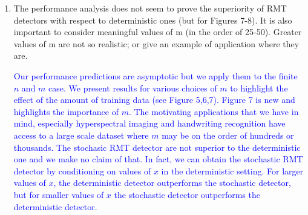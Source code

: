 \documentclass[11pt]{article}
\begin{document}
\begin{enumerate}
\item The performance analysis does  not seem to prove the superiority of RMT detectors with respect to deterministic ones (but for Figures 7-8). It is also important to consider meaningful values of m (in the order of 25-50). Greater values of m
are not so realistic; or give an example of application where they are.

\textcolor{blue}{Our performance predictions are asymptotic but we apply them to the finite $n$ and $m$ case. We present results for various choices of $m$ to highlight the effect of the amount of training data (see Figure 5,6,7). Figure 7 is new and highlights the importance of $m$. The motivating applications that we have in mind, especially hyperspectral imaging and handwriting recognition have access to a large scale dataset where $m$ may be on the order of hundreds or thousands. The stochasic RMT detector are not superior to the deterministic one and we make no claim of that. In fact, we can obtain the stochastic RMT detector by conditioning on values of $x$ in the deterministic setting. For larger values of $x$, the deterministic detector outperforms the stochastic detector, but for smaller values of $x$ the stochastic detector outperforms the deterministic detector.}

\end{enumerate}
\end{document}

